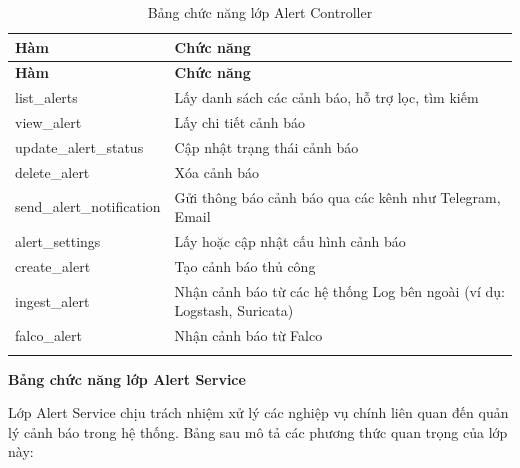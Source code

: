 \documentclass[../DoAn.tex]{subfiles}
\begin{document}
\begin{longtable}{|p{5cm}|p{9cm}|}
\hline
\textbf{Hàm} & \textbf{Chức năng} \\ \hline
\endfirsthead

\hline
\textbf{Hàm} & \textbf{Chức năng} \\ \hline
\endhead

list\_alerts & Lấy danh sách các cảnh báo, hỗ trợ lọc, tìm kiếm \\ \hline
view\_alert & Lấy chi tiết cảnh báo \\ \hline
update\_alert\_status & Cập nhật trạng thái cảnh báo \\ \hline
delete\_alert & Xóa cảnh báo \\ \hline
send\_alert\_notification & Gửi thông báo cảnh báo qua các kênh như Telegram, Email \\ \hline
alert\_settings & Lấy hoặc cập nhật cấu hình cảnh báo \\ \hline
create\_alert & Tạo cảnh báo thủ công \\ \hline
ingest\_alert & Nhận cảnh báo từ các hệ thống Log bên ngoài (ví dụ: Logstash, Suricata) \\ \hline
falco\_alert & Nhận cảnh báo từ Falco \\ \hline

\caption{Bảng chức năng lớp Alert Controller} \label{table:alert-controller} \\
\end{longtable}

\vspace{0.5cm}

\textbf{Bảng chức năng lớp Alert Service}

Lớp Alert Service chịu trách nhiệm xử lý các nghiệp vụ chính liên quan đến quản lý cảnh báo trong hệ thống. Bảng sau mô tả các phương thức quan trọng của lớp này:
\end{document}
